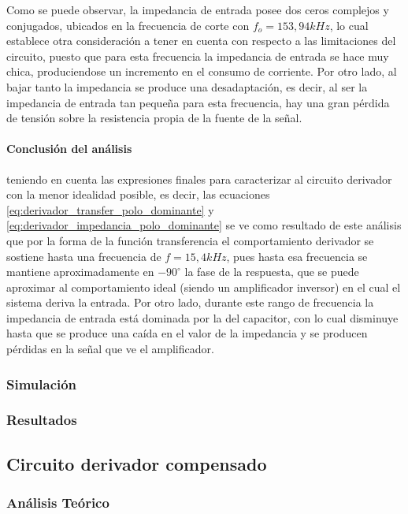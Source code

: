 Como se puede observar, la impedancia de entrada posee dos ceros complejos y conjugados, ubicados en la frecuencia de corte con $f_o = 153,94kHz$, lo cual establece otra consideración a tener en cuenta con respecto a las limitaciones del circuito, puesto que para esta frecuencia la impedancia de entrada se hace muy chica, produciendose un incremento en el consumo de corriente. Por otro lado, al bajar tanto la impedancia se produce una desadaptaci\'on, es decir, al ser la impedancia de entrada tan peque\~na para esta frecuencia, hay una gran p\'erdida de tensi\'on sobre la resistencia propia de la fuente de la se\~nal.

\paragraph*{Conclusi\'on del an\'alisis} teniendo en cuenta las expresiones finales para caracterizar al circuito derivador con la menor idealidad posible, es decir, las ecuaciones \ref{eq:derivador_transfer_polo_dominante} y \ref{eq:derivador_impedancia_polo_dominante} se ve como resultado de este an\'alisis que por la forma de la funci\'on transferencia el comportamiento derivador se sostiene hasta una frecuencia de $f = 15,4kHz$, pues hasta esa frecuencia se mantiene aproximadamente en $-90^{\circ}$ la fase de la respuesta, que se puede aproximar al comportamiento ideal (siendo un amplificador inversor) en el cual el sistema deriva la entrada. Por otro lado, durante este rango de frecuencia la impedancia de entrada est\'a dominada por la del capacitor, con lo cual disminuye hasta que se produce una ca\'ida en el valor de la impedancia y se producen p\'erdidas en la se\~nal que ve el amplificador.

\subsubsection{Simulaci\'on}
\subsubsection{Resultados}

	\subsection{Circuito derivador compensado}

\subsubsection{An\'alisis Te\'orico}

